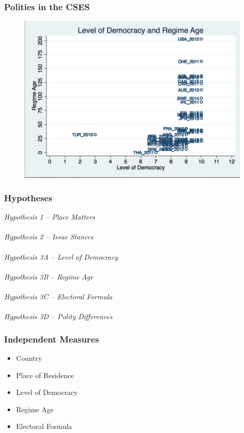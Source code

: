 \documentclass[20pt]{beamer}
\newcommand\e{\emph}
\begin{document}
\begin{frame}
\frametitle{Polities in the CSES}
\begin{figure}[ht!]    \centering
	{	 \includegraphics[width=.8\textwidth]{DemAge}}
\end{figure}
\end{frame}

\begingroup
\begin{frame}
\footnotesize
\frametitle{Hypotheses}
\e {Hypothesis 1 -- Place Matters} \\
~~\\
\e{Hypothesis 2 -- Issue Stances} \\
~~\\
\e{Hypothesis 3A -- Level of Democracy} \\
~~\\
\e{Hypothesis 3B -- Regime Age} \\
~~\\
\e{Hypothesis 3C -- Electoral Formula}\\
~~\\
\e{Hypothesis 3D -- Polity Differences} 

\end{frame}

\begin{frame}

\frametitle{Independent Measures}
\begin{itemize}
	\item Country
	\item Place of Residence
	\item Level of Democracy
	\item Regime Age
	\item Electoral Formula
\end{itemize}
\end{frame}
\end{document}
